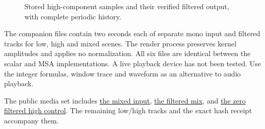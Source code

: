 \begin{figure}[htbp]
  \centering
  \caption{Stored high-component samples and their verified filtered output, with complete periodic history.}
\end{figure}

The companion files contain two seconds each of separate mono input and filtered
tracks for low, high and mixed scenes. The render process preserves kernel amplitudes
and applies no normalization. All six files are identical between the scalar and MSA
implementations. A live playback device has not been tested. Use the integer formulas,
window trace and waveform as an alternative to audio playback.

The public media set includes
\href{https://raw.githubusercontent.com/nhubbard/mars-book/main/book/media/021-fixed-point-fir/mixed-input.wav}{the mixed input},
\href{https://raw.githubusercontent.com/nhubbard/mars-book/main/book/media/021-fixed-point-fir/mixed-filtered.wav}{the filtered mix}, and
\href{https://raw.githubusercontent.com/nhubbard/mars-book/main/book/media/021-fixed-point-fir/high-filtered.wav}{the zero filtered high control}.
The remaining low/high tracks and the exact hash receipt accompany them.
